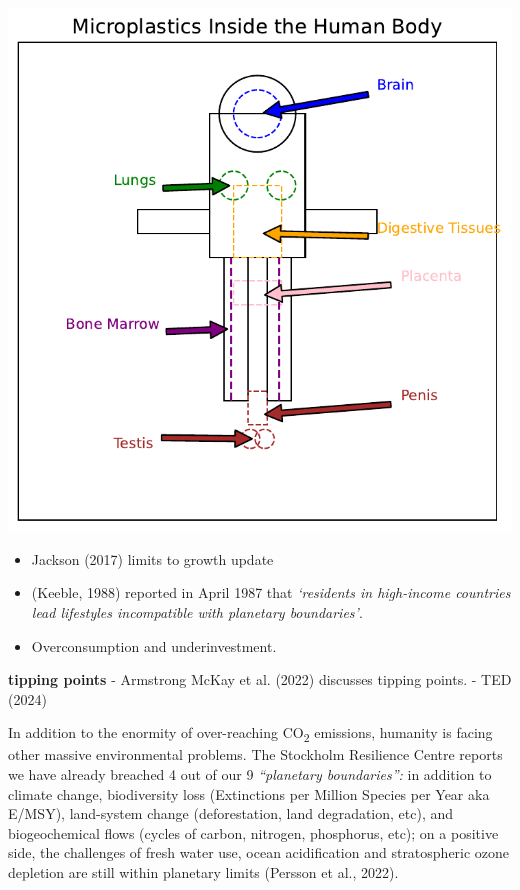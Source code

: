 \documentclass[
  letterpaper,
  DIV=11,
  numbers=noendperiod]{scrartcl}
\providecommand{\tightlist}{%
  \setlength{\itemsep}{0pt}\setlength{\parskip}{0pt}}\usepackage{longtable,booktabs,array}
\begin{document}
\includegraphics{_thesis_files/figure-pdf/cell-17-output-1.pdf}

\begin{itemize}
\tightlist
\item
  Jackson (2017) limits to growth update
\item
  (Keeble, 1988) reported in April 1987 that \emph{`residents in
  high-income countries lead lifestyles incompatible with planetary
  boundaries'}.
\item
  Overconsumption and underinvestment.
\end{itemize}

\textbf{tipping points} - Armstrong McKay et al. (2022) discusses
tipping points. - TED (2024)

In addition to the enormity of over-reaching CO\textsubscript{2}
emissions, humanity is facing other massive environmental problems. The
Stockholm Resilience Centre reports we have already breached 4 out of
our 9 \emph{``planetary boundaries'':} in addition to climate change,
biodiversity loss (Extinctions per Million Species per Year aka E/MSY),
land-system change (deforestation, land degradation, etc), and
biogeochemical flows (cycles of carbon, nitrogen, phosphorus, etc); on a
positive side, the challenges of fresh water use, ocean acidification
and stratospheric ozone depletion are still within planetary limits
(Persson et al., 2022).
\end{document}
